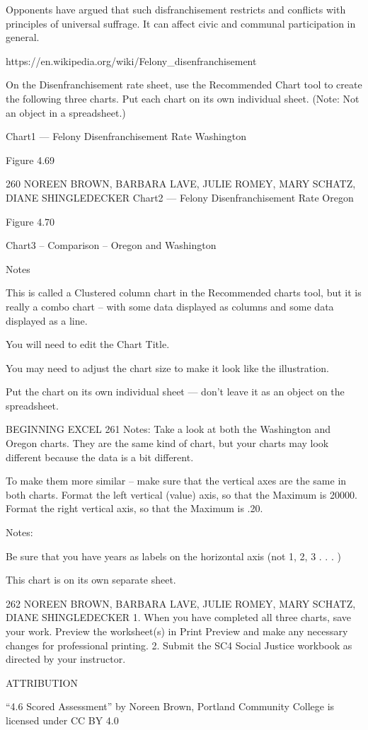 Opponents have argued that such disfranchisement restricts and conflicts with principles of universal
suffrage. It can affect civic and communal participation in general.

https://en.wikipedia.org/wiki/Felony_disenfranchisement

On the Disenfranchisement rate sheet, use the Recommended Chart tool to create the following three
charts. Put each chart on its own individual sheet. (Note: Not an object in a spreadsheet.)

Chart1 — Felony Disenfranchisement Rate Washington




Figure 4.69




260 NOREEN BROWN, BARBARA LAVE, JULIE ROMEY, MARY SCHATZ, DIANE SHINGLEDECKER
Chart2 — Felony Disenfranchisement Rate Oregon




Figure 4.70


Chart3 – Comparison – Oregon and Washington




Notes

This is called a Clustered column chart in the Recommended charts tool, but it is really a combo chart – with some
data displayed as columns and some data displayed as a line.

You will need to edit the Chart Title.

You may need to adjust the chart size to make it look like the illustration.

Put the chart on its own individual sheet — don’t leave it as an object on the spreadsheet.




BEGINNING EXCEL 261
Notes:
Take a look at both the Washington and Oregon charts. They are the same kind of chart, but your charts may look
different because the data is a bit different.

To make them more similar – make sure that the vertical axes are the same in both charts. Format the left vertical
(value) axis, so that the Maximum is 20000. Format the right vertical axis, so that the Maximum is .20.




Notes:

Be sure that you have years as labels on the horizontal axis (not 1, 2, 3 . . . )

This chart is on its own separate sheet.




262 NOREEN BROWN, BARBARA LAVE, JULIE ROMEY, MARY SCHATZ, DIANE SHINGLEDECKER
1. When you have completed all three charts, save your work. Preview the worksheet(s) in Print
Preview and make any necessary changes for professional printing.
2. Submit the SC4 Social Justice workbook as directed by your instructor.

ATTRIBUTION

“4.6 Scored Assessment” by Noreen Brown, Portland Community College is licensed under CC BY
4.0




